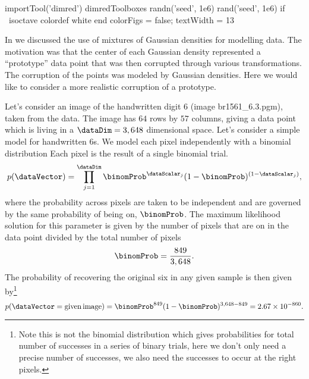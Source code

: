 \begin{octave}
  importTool('dimred')
  dimredToolboxes
  randn('seed', 1e6)
  rand('seed', 1e6)
  if ~isoctave
    colordef white
  end
  colorFigs = false;
  textWidth = 13
\end{octave}
In  we discussed the use of
mixtures of Gaussian densities for modelling data. The motivation was
that the center of each Gaussian density represented a ``prototype''
data point that was then corrupted through various
transformations. The corruption of the points was modeled by Gaussian
densities.  Here we would like to consider a more realistic corruption
of a prototype.

Let's consider an image of the handwritten digit 6 (image
br1561\_6.3.pgm), taken from the  data. The image has
$64$ rows by $57$ columns, giving a data point which is living in a
$\dataDim=3,648$ dimensional space. Let's consider a simple model for
handwritten 6s. We model each pixel independently with a binomial
distribution Each pixel is the result of a
single binomial trial.
\[
p(\dataVector) = \prod_{j=1}^\dataDim \binomProb^{\dataScalar_j}
(1-\binomProb)^{(1-\dataScalar_j)},
\]
where the probability across pixels are taken to be independent and
are governed by the same probability of being on, $\binomProb$. The
maximum likelihood solution for this parameter is given by the number
of pixels that are on in the data point divided by the total number of
pixels
\[
\binomProb = \frac{849}{3,648}.
\]
The probability of recovering the original six in any given sample is
then given by\footnote{Note this is not the binomial distribution
  which gives probabilities for total number of successes in a series
  of binary trials, here we don't only need a precise number of
  successes, we also need the successes to occur at the right pixels.}
\[
p(\dataVector=\text{given\,image}) = \binomProb^{849}(1-\binomProb)^{3,648 - 849
}=2.67\times10^{-860}.
\]
